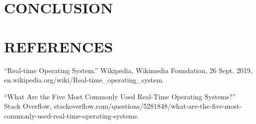 \documentclass[letterpaper, 10 pt, conference]{IEEEconf}
\begin{document}
\section{CONCLUSION}

\section*{REFERENCES}




\begin{enumerate}[label={[\arabic*]}]
\item ``Real-time Operating System.'' Wikipedia, Wikimedia Foundation, 26 Sept. 2019, \\ en.wikipedia.org/wiki/Real-time\_operating\_system.
\item “What Are the Five Most Commonly Used Real-Time Operating Systems?” Stack Overflow, stackoverflow.com/questions/5281848/what-are-the-five-most-commonly-used-real-time-operating-systems.
\end{enumerate}
\end{document}
